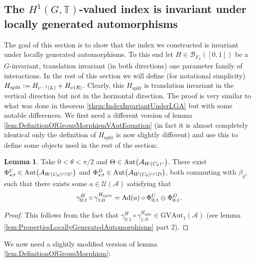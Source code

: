 \documentclass[12pt,a4paper,twoside]{article}
\newcommand{\defeq}{\vcentcolon=}
\let\originalleft\left
\let\originalright\right
\renewcommand{\left}{\mathopen{}\mathclose\bgroup\originalleft}
\renewcommand{\right}{\aftergroup\egroup\originalright}
\newcommand{\UU}{\mathcal U}
\newcommand{\BB}{\mathcal B}
\newcommand{\TT}{\mathbb T}
\renewcommand{\AA}{\mathcal A}
\newcommand{\Ad}[1]{\textrm{Ad}\left(#1\right)}
\newcommand{\Aut}[1]{\textrm{Aut}\left(#1\right)}
\theoremstyle{definition}
\newtheorem{lemma}[theorem]{Lemma}
\numberwithin{equation}{section}
\begin{document}
\subsection{The $H^1(G,\TT)$-valued index is invariant under locally generated automorphisms}\label{sec:H^1IndexInvariantUnderRotations}
The goal of this section is to show that the index we constructed is invariant under locally generated automorphisms. To this end let $H\in \BB_{F_\phi}([0,1])$ be a $G$-invariant, translation invariant (in both directions) one parameter family of interactions. In the rest of this section we will define (for notational simplicity) $H_{\text{split}}\defeq H_{\nu^{-1}(L)}+H_{\nu(R)}$. Clearly, this $H_{\text{split}}$ is translation invariant in the vertical direction but not in the horizontal direction. The proof is very similar to what was done in theorem \ref{thrm:IndexInvariantUnderLGA} but with some notable differences. We first need a different version of lemma \ref{lem:DefinitionOfGroupMorphismVAutEquation} (in fact it is almost completely identical only the definition of $H_{\text{split}}$ is now slightly different) and use this to define some objects used in the rest of the section:
\begin{lemma}\label{lem:DefinitionOfGroupMorphismVAutEquationTwoTranslations}
	Take $0<\theta<\pi/2$ and $\Theta\in \Aut{\AA_{W(C_\theta)^c}}$. There exist $\Phi^U_{s;t}\in\Aut{\AA_{W(C_\theta)^c\cap U}}$ and $\Phi^D_{s;t}\in\Aut{\AA_{W(C_\theta)^c\cap D}}$, both commuting with $\beta_g$, such that there exists some $a\in\UU(\AA)$ satisfying that
	\begin{equation}\label{eq:DefinitionOfGroupMorphismVAutEquationTwoTranslations}
	\gamma^H_{0;1}\circ\gamma^{H_\text{split}}_{1;0}=\Ad{a}\circ \Phi^U_{0;1}\otimes\Phi^D_{0;1}.
	\end{equation}
\end{lemma}
\begin{proof}
	This follows from the fact that $\gamma^H_{0;1}\circ\gamma^{H_\text{split}}_{1;0}\in \textrm{GVAut}_1(\AA)$ (see lemma \ref{lem:PropertiesLocallyGeneratedAutomorphisms} part 2).
\end{proof}
We now need a slightly modified version of lemma \ref{lem:DefinitionOfGroupMorphism}:
\end{document}
